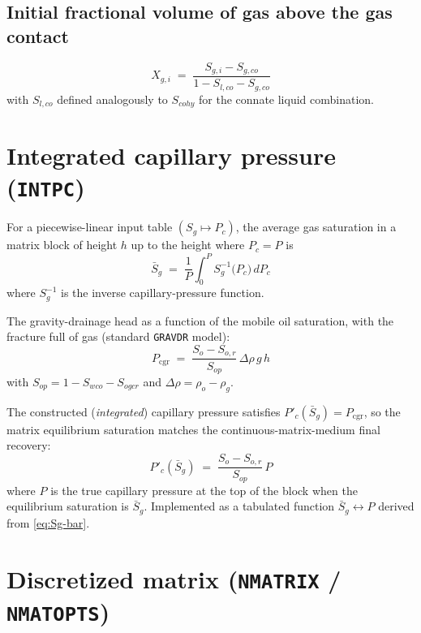 \documentclass[11pt,a4paper]{article}
\newcommand{\kw}[1]{\texttt{#1}}
\begin{document}
\subsection*{Initial fractional volume of gas above the gas contact}
\begin{equation}
X_{g,i} \;=\; \frac{S_{g,i} - S_{g,co}}{1 - S_{l,co} - S_{g,co}}
\label{eq:Xgi}
\tag{TD 2.88}
\end{equation}
with $S_{l,co}$ defined analogously to $S_{coh y}$ for the connate liquid combination.

\section{Integrated capillary pressure (\kw{INTPC})}
For a piecewise-linear input table $(S_g \mapsto P_c)$, the average gas saturation in a matrix block of height $h$ up to the height where $P_c = P$ is
\begin{equation}
\bar S_g \;=\; \frac{1}{P}\int_{0}^{P} S_g^{-1}\!\bigl(P_c\bigr)\,dP_c
\label{eq:Sg-bar}
\tag{TD 2.89}
\end{equation}
where $S_g^{-1}$ is the inverse capillary-pressure function.

The gravity-drainage head as a function of the mobile oil saturation, with the fracture full of gas (standard \kw{GRAVDR} model):
\begin{equation}
P_{\text{cgr}} \;=\; \frac{S_o - S_{o,r}}{S_{op}}\,\Delta\rho\,g\,h
\label{eq:Pcgr}
\tag{TD 2.90}
\end{equation}
with $S_{op} = 1 - S_{wco} - S_{ogcr}$ and $\Delta\rho = \rho_o - \rho_g$.

The constructed (\emph{integrated}) capillary pressure satisfies $P'_c(\bar S_g) = P_{\text{cgr}}$, so the matrix equilibrium saturation matches the continuous-matrix-medium final recovery:
\begin{equation}
P'_c(\bar S_g) \;=\; \frac{S_o - S_{o,r}}{S_{op}}\,P
\label{eq:Pc-prime}
\tag{TD 2.91}
\end{equation}
where $P$ is the true capillary pressure at the top of the block when the equilibrium saturation is $\bar S_g$. Implemented as a tabulated function $\bar S_g \leftrightarrow P$ derived from \eqref{eq:Sg-bar}.

\section{Discretized matrix (\kw{NMATRIX} / \kw{NMATOPTS})}
\end{document}
